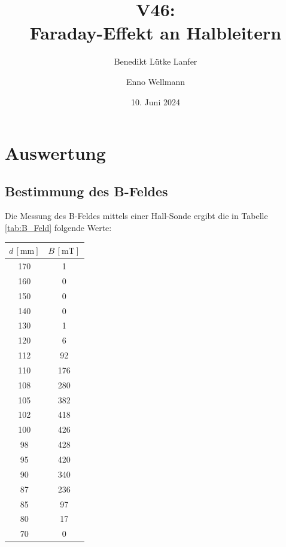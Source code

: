 

\title{V46:\\ Faraday-Effekt an Halbleitern}
\author{Benedikt Lütke Lanfer \and Enno Wellmann}
\date{10. Juni 2024}
\publishers{TU Dortmund – Fakultät Physik}



\tableofcontents
\newpage







\text{}
\newpage
\section{Auswertung}
\subsection{Bestimmung des B-Feldes}
Die Messung des B-Feldes mittels einer Hall-Sonde ergibt die in Tabelle \eqref{tab:B_Feld} folgende Werte:

\begin{table}[H]
	\centering
    \label{tab:B_Feld}
	\begin{tabular}{c c}
		\toprule
		$d \, [\unit{\milli\meter}]$ & $B \, [\unit{\milli\tesla}] $  \\
		\midrule
        170 & 1 \\
        160 & 0 \\
        150 & 0 \\
        140 & 0 \\
        130 & 1 \\
        120 & 6 \\
        112 & 92 \\
        110 & 176 \\
        108 & 280 \\
        105 & 382 \\
        102 & 418 \\
        100 & 426 \\
        98  & 428 \\
        95  & 420 \\
        90  & 340 \\
        87  & 236 \\
        85  & 97 \\
        80  & 17 \\
        70  & 0  \\
		\bottomrule
	\end{tabular}
\end{table}

